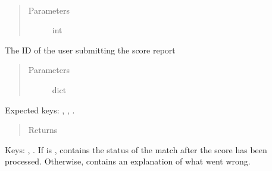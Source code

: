 \documentclass[letterpaper,10pt,english]{sphinxmanual}
\begin{document}
\begin{fulllineitems}
\label{\detokenize{tiger_leagues/models/readme:tiger_leagues.models.league_model.process_player_score_report}}~\begin{quote}\begin{description}
\item[{Parameters}] \leavevmode
{} \textendash{} int

\end{description}\end{quote}

The ID of the user submitting the score report
\begin{quote}\begin{description}
\item[{Parameters}] \leavevmode
{} \textendash{} dict

\end{description}\end{quote}

Expected keys: , , .
\begin{quote}\begin{description}
\item[{Returns}] \leavevmode
{}

\end{description}\end{quote}

Keys: , . If  is ,  
contains the status of the match after the score has been processed. 
Otherwise,  contains an explanation of what went wrong.

\end{fulllineitems}

\end{document}
